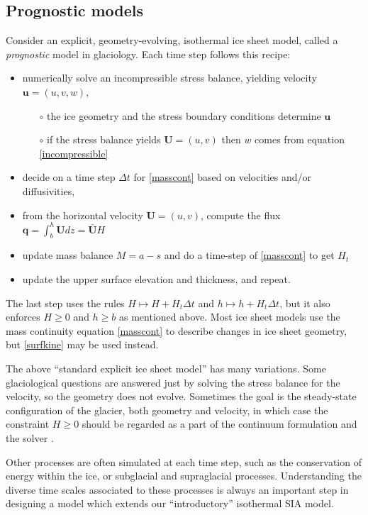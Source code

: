 \documentclass[letterpaper,final,12pt,reqno]{amsart}
\newcommand{\bq}{\mathbf{q}}
\newcommand{\bU}{\mathbf{U}}
\begin{document}
\subsection*{Prognostic models}  Consider an explicit, geometry-evolving, isothermal ice sheet model, called a \emph{prognostic} model in glaciology.  Each time step follows this recipe:
  \begin{itemize}
  \item numerically solve an incompressible stress balance, yielding velocity $\mathbf{u}=(u,v,w)$,
    \begin{itemize}
    \item[$\circ$] the ice geometry and the stress boundary conditions determine $\mathbf{u}$
    \item[$\circ$] if the stress balance yields $\mathbf{U}=(u,v)$ then $w$ comes from equation \eqref{incompressible}
    \end{itemize}
  \item decide on a time step $\Delta t$ for \eqref{masscont} based on velocities and/or diffusivities,
  \item from the horizontal velocity $\mathbf{U}=(u,v)$, compute the flux $\bq = \int_b^h \bU dz = \bar{\bU} H$
  \item update mass balance $M=a-s$ and do a time-step of \eqref{masscont} to get $H_t$
  \item update the upper surface elevation and thickness, and repeat.
  \end{itemize}
The last step uses the rules $H \mapsto H + H_t \Delta t$ and $h \mapsto h + H_t \Delta t$, but it also enforces $H\ge 0$ and $h\ge b$ as mentioned above.  Most ice sheet models use the mass continuity equation \eqref{masscont} to describe changes in ice sheet geometry, but \eqref{surfkine} may be used instead.

The above ``standard explicit ice sheet model'' has many variations.  Some glaciological questions are answered just by solving the stress balance for the velocity, so the geometry does not evolve.  Sometimes the goal is the steady-state configuration of the glacier, both geometry and velocity, in which case the constraint $H\ge 0$ should be regarded as a part of the continuum formulation and the solver \cite{Bueler2016,JouvetBueler2012}.

Other processes are often simulated at each time step, such as the conservation of energy within the ice, or subglacial and supraglacial processes.  Understanding the diverse time scales associated to these processes is always an important step in designing a model which extends our ``introductory'' isothermal SIA model.
\end{document}
